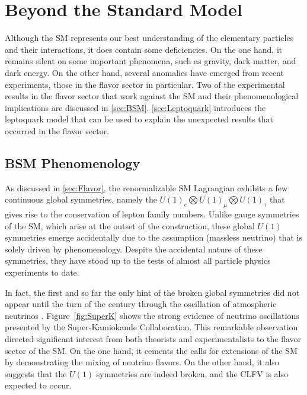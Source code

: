 \chapter{Beyond the Standard Model}
\label{chap:BSM}

Although the \ac{SM} represents our best understanding of the elementary particles and their interactions, it does contain some deficiencies. On the one hand, it remains silent on some important phenomena, such as gravity, dark matter, and dark energy. On the other hand, several anomalies have emerged from recent experiments, those in the flavor sector in particular. Two of the experimental results in the flavor sector that work against the \ac{SM} and their phenomenological implications are discussed in \autoref{sec:BSM}. \autoref{sec:Leptoquark} introduces the leptoquark model that can be used to explain the unexpected results that occurred in the flavor sector.

\section{BSM Phenomenology}
\label{sec:BSM}

As discussed in \autoref{sec:Flavor}, the renormalizable \ac{SM} Lagrangian exhibits a few continuous global symmetries, namely the $U(1)_{e}\bigotimes U(1)_{\mu}\bigotimes U(1)_{\tau}$ that gives rise to the conservation of lepton family numbers. Unlike gauge symmetries of the \ac{SM}, which arise at the outset of the construction, these global $U(1)$ symmetries emerge accidentally due to the assumption (massless neutrino) that is solely driven by phenomenology. Despite the accidental nature of these symmetries, they have stood up to the tests of almost all particle physics experiments to date.  

In fact, the first and so far the only hint of the broken global symmetries did not appear until the turn of the century through the oscillation of atmospheric neutrinos \cite{Super-Kamiokande:1998kpq,SNO:2002tuh}. Figure~\ref{fig:SuperK} shows the strong evidence of neutrino oscillations presented by the Super-Kamiokande Collaboration. This remarkable observation directed significant interest from both theorists and experimentalists to the flavor sector of the \ac{SM}. On the one hand, it cements the calls for extensions of the \ac{SM} by demonstrating the mixing of neutrino flavors. On the other hand, it also suggests that the $U(1)$ symmetries are indeed broken, and the \ac{CLFV} is also expected to occur. 

